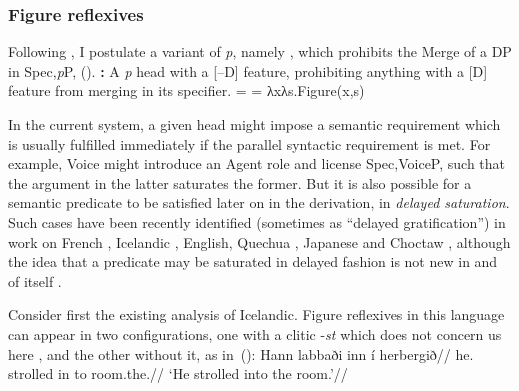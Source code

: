 			\subsubsection{Figure reflexives} \label{vz:pz:syn:figrefl}	
Following \cite{wood15springer}, I postulate a variant of \emph{p}, namely {\pz}, which prohibits the Merge of a DP in Spec,\emph{p}P, (\nextx).
\pex \textbf{\pz:}
	\a A \emph{p} head with a [--D] feature, prohibiting anything with a [D] feature from merging in its specifier.
    \a \denote{\pz} =  = λxλs.Figure(x,s)
\xe

In the current system, a given head might impose a semantic requirement which is usually fulfilled immediately if the parallel syntactic requirement is met. For example, Voice might introduce an Agent role and license Spec,VoiceP, such that the argument in the latter saturates the former. But it is also possible for a semantic predicate to be satisfied later on in the derivation, in \emph{delayed saturation}. Such cases have been recently identified (sometimes as ``delayed gratification'') in work on French \citep{schaefer12}, Icelandic \citep{wood14nllt,wood15springer}, English, Quechua \citep{myler16mit}, Japanese \citep{woodmarantz17} and Choctaw \citep{tyler19}, although the idea that a predicate may be saturated in delayed fashion is not new in and of itself \citep{higginbotham85}.

Consider first the existing analysis of Icelandic. Figure reflexives in this language can appear in two configurations, one with a clitic -\emph{st} which does not concern us here \citep{wood14nllt}, and the other without it, as in~(\nextx):
\ex\label{ex:vz:is-figrefl}
	 \begingl
	 \gla Hann labbaði inn í herbergið//
	 \glb he. strolled in to room.the.//
	 \glft `He strolled into the room.'//
	 \endgl
\xe

